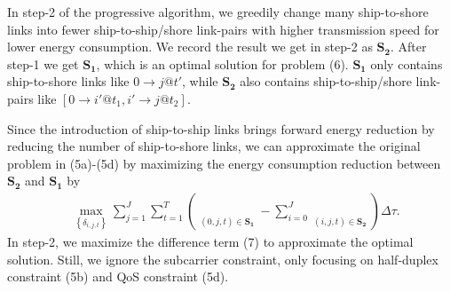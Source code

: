 \documentclass[journal]{IEEEtran}
\begin{document}
 
 In step-2 of the progressive algorithm, we greedily change many ship-to-shore links into fewer ship-to-ship/shore link-pairs with higher transmission speed for lower energy consumption. We record the result we get in step-2 as ${{\mathbf{S}}_{\mathbf{2}}}$. After step-1 we get ${{\mathbf{S}}_{\mathbf{1}}}$, which is an optimal solution for problem (6). ${{\mathbf{S}}_{\mathbf{1}}}$ only contains ship-to-shore links like $0 \to j@t'$, while ${{\mathbf{S}}_{\mathbf{2}}}$ also contains ship-to-ship/shore link-pairs like $\left[ {0 \to i'@{t_1},i' \to j@{t_2}} \right]$. 
 
 Since the introduction of ship-to-ship links brings forward energy reduction by reducing the number of ship-to-shore links, we can approximate the original problem in (5a)-(5d) by maximizing the energy consumption reduction between ${{\mathbf{S}}_{\mathbf{2}}}$ and ${{\mathbf{S}}_{\mathbf{1}}}$ by 
 \begin{align}
   &\mathop {\max }\limits_{{\left\{ {{\delta _{i,j,t}}} \right\}}}  {{\sum\limits_{j = 1}^J \sum\limits_{t = 1}^{T}{\left( {\mathop {{P_{0}}\delta _{0,j,t} }\limits_{\left( {0,j,t} \right) \in {{\mathbf{S}}_{\mathbf{1}}}} - \sum\limits_{i = 0}^J {\mathop {{P_{i}}\delta _{i,j,t}}\limits_{\left( {i,j,t} \right) \in {{\mathbf{S}}_{\mathbf{2}}}} } } \right) \Delta \tau } } } .
 \end{align}
 In step-2, we maximize the difference term (7) to approximate the optimal solution. Still, we ignore the subcarrier constraint, only focusing on half-duplex constraint (5b) and QoS constraint (5d). 
\end{document}
